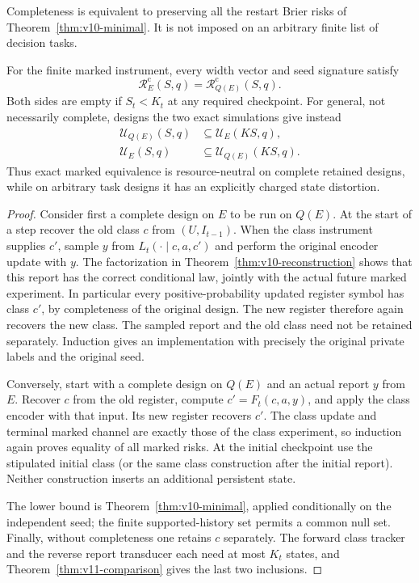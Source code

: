 Completeness is equivalent to preserving all the restart Brier risks of
Theorem~\ref{thm:v10-minimal}. It is not imposed on an arbitrary finite
list of decision tasks.

\begin{theorem}
\label{thm:v11-fusion}
For the finite marked instrument, every width vector and seed signature
satisfy
\begin{equation}
 \mathcal R_E^{\mathrm c}(S,q)=
 \mathcal R_{Q(E)}^{\mathrm c}(S,q).
 \label{eq:v11-fusion}
\end{equation}
Both sides are empty if $S_t<K_t$ at any required checkpoint. For general,
not necessarily complete, designs the two exact simulations give instead
\begin{align*}
 \mathcal U_{Q(E)}(S,q)&\subseteq\mathcal U_E(KS,q),\\
 \mathcal U_E(S,q)&\subseteq\mathcal U_{Q(E)}(KS,q).
\end{align*}
Thus exact marked equivalence is resource-neutral on complete retained
designs, while on arbitrary task designs it has an explicitly charged
state distortion.
\end{theorem}

\begin{proof}
Consider first a complete design on $E$ to be run on $Q(E)$. At the start
of a step recover the old class $c$ from $(U,I_{t-1})$. When the class
instrument supplies $c'$, sample $y$ from $L_t(\cdot\mid c,a,c')$ and
perform the original encoder update with $y$. The factorization in
Theorem~\ref{thm:v10-reconstruction} shows that this report has the correct
conditional law, jointly with the actual future marked experiment.
In particular every positive-probability updated register symbol has
class $c'$, by completeness of the original design. The new register
therefore again recovers the new class. The sampled report and the old
class need not be retained separately. Induction gives an implementation
with precisely the original private labels and the original seed.

Conversely, start with a complete design on $Q(E)$ and an actual report
$y$ from $E$. Recover $c$ from the old register, compute
$c'=F_t(c,a,y)$, and apply the class encoder with that input. Its new
register recovers $c'$. The class update and terminal marked channel are
exactly those of the class experiment, so induction again proves equality
of all marked risks. At the initial checkpoint use the stipulated initial
class (or the same class construction after the initial report). Neither
construction inserts an additional persistent state.

The lower bound is Theorem~\ref{thm:v10-minimal}, applied conditionally on
the independent seed; the finite supported-history set permits a common
null set. Finally, without completeness one retains $c$ separately.
The forward class tracker and the reverse report transducer each need at
most $K_t$ states, and Theorem~\ref{thm:v11-comparison} gives the last two
inclusions.
\end{proof}

